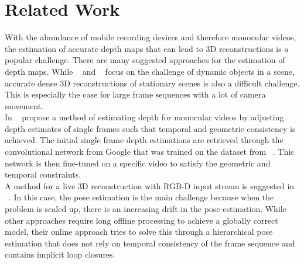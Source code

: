 \chapter{Related Work}
    With the abundance of mobile recording devices and therefore monocular videos, the estimation of accurate depth maps that can lead to 3D reconstructions is a popular challenge.
    There are many suggested approaches for the estimation of depth maps.
    While ~\cite{roussos2012dense} and ~\cite{russell2014video} focus on the challenge of dynamic objects in a scene, accurate dense 3D reconstructions of stationary scenes is also a difficult challenge.
    This is especially the case for large frame sequences with a lot of camera movement.\\
    In ~\cite{luo2020consistent} \citeauthor{luo2020consistent} propose a method of estimating depth for monocular videos by adjusting depth estimates of single frames such that temporal and geometric consistency is achieved.
    The initial single frame depth estimations are retrieved through the convolutional network from Google that was trained on the dataset from ~\cite{mannequin}.
    This network is then fine-tuned on a specific video to satisfy the geometric and temporal constraints.\\
    A method for a live 3D reconstruction with RGB-D input stream is suggested in ~\cite{dai2017bundlefusion}.
    In this case, the pose estimation is the main challenge because when the problem is scaled up, there is an increasing drift in the pose estimation.
    While other approaches require long offline processing to achieve a globally correct model, their online approach tries to solve this through a hierarchical pose estimation that does not rely on temporal consistency of the frame sequence and contains implicit loop closures.